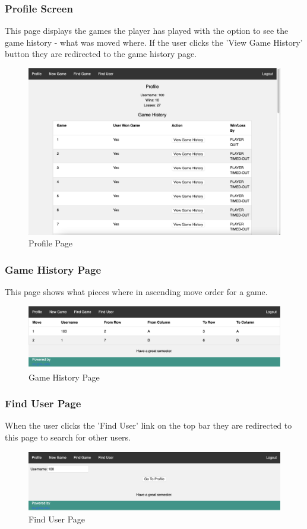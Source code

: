 \documentclass[12pt]{article}
\begin{document}
\subsubsection{Profile Screen}
This page displays the games the player has played with the option to see the game history - what was moved where. If the user clicks the 'View Game History' button they are redirected to the game history page.
\begin{figure}[h!]
    \includegraphics[width=\linewidth]{OTHER_PLAYER_PROFILE.png}
    \caption{Profile Page}
\end{figure}

\subsubsection{Game History Page}
This page shows what pieces where in ascending move order for a game.
\begin{figure}[h!]
    \includegraphics[width=\linewidth]{GAME_HISTORY.png}
    \caption{Game History Page}
\end{figure}

\subsubsection{Find User Page}
When the user clicks the 'Find User' link on the top bar they are redirected to this page to search for other users.
\begin{figure}[h!]
    \includegraphics[width=\linewidth]{SEARCH_FOR_USER.png}
    \caption{Find User Page}
\end{figure}
\end{document}
